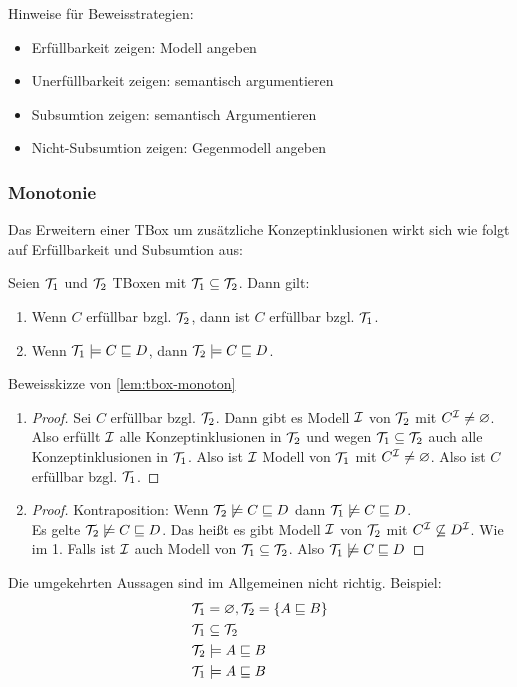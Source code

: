 Hinweise für Beweisstrategien:
\begin{itemize}
\item Erfüllbarkeit zeigen: Modell angeben
\item Unerfüllbarkeit zeigen: semantisch argumentieren
\item Subsumtion zeigen: semantisch Argumentieren
\item Nicht-Subsumtion zeigen: Gegenmodell angeben
\end{itemize}

\subsubsection{Monotonie}\label{monotonie}
Das Erweitern einer TBox um zusätzliche Konzeptinklusionen wirkt sich wie folgt auf Erfüllbarkeit und Subsumtion aus:

\begin{lemma}
\label{lem:tbox-monoton}
Seien $\mathcal{T}_1$ und $\mathcal{T}_2$ TBoxen mit $\mathcal{T}_1 \subseteq \mathcal{T}_2$. Dann gilt:
\begin{enumerate}
\item
  Wenn $C$ erfüllbar bzgl. $\mathcal{T}_2$, dann ist $C$ erfüllbar bzgl.
  $\mathcal{T}_1$.
\item
  Wenn $\mathcal{T}_1 \models C \sqsubseteq D$, dann
  $\mathcal{T}_2 \models C \sqsubseteq D$.
\end{enumerate}
\end{lemma}

\begin{tafel}Beweisskizze von \autoref{lem:tbox-monoton}
\begin{enumerate}
  \item \begin{proof}
      Sei $C$ erfüllbar bzgl. $\mathcal{T}_2$.
  Dann gibt es Modell $\mathcal{I}$ von $\mathcal{T}_2$ mit $C^{\mathcal{I}} \neq \varnothing$.
  Also erfüllt $\mathcal{I}$ alle Konzeptinklusionen in $\mathcal{T}_2$ und wegen $\mathcal{T}_1 \subseteq \mathcal{T}_2$ auch alle Konzeptinklusionen in $\mathcal{T}_1$.
  Also ist $\mathcal{I}$ Modell von $\mathcal{T}_1$ mit $C^{\mathcal{I}} \neq \varnothing$.
  Also ist $C$ erfüllbar bzgl. $\mathcal{T}_1$.
  \end{proof}
  \item \begin{proof}
    Kontraposition: Wenn $\mathcal{T}_2 \not\models C \sqsubseteq D$ dann $\mathcal{T}_1 \not\models C \sqsubseteq D$. \\
  Es gelte $\mathcal{T}_2 \not\models C \sqsubseteq D$.
  Das heißt es gibt Modell $\mathcal{I}$ von $\mathcal{T}_2$ mit $C^{\mathcal{I}} \not\subseteq D^{\mathcal{I}}$.
  Wie im 1. Falls ist $\mathcal{I}$ auch Modell von $\mathcal{T}_1 \subseteq \mathcal{T}_2$.
  Also $\mathcal{T}_1 \not\models C \sqsubseteq D$
  \end{proof}
\end{enumerate}

Die umgekehrten Aussagen sind im Allgemeinen nicht richtig. Beispiel:
\begin{align*}
    &\mathcal{T}_1 = \varnothing, \mathcal{T}_2 = \{A \sqsubseteq B\}\\
    &\mathcal{T}_1 \subseteq \mathcal{T}_2 \\
    &\mathcal{T}_2 \models A \sqsubseteq B\\
    &\mathcal{T}_1 \models A \sqsubseteq B
\end{align*}
\end{tafel}

